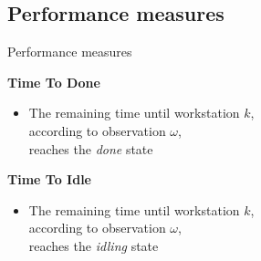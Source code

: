   \subsection{Performance measures}
    \begin{frame}{Performance measures}
      \newcommand{\schemascale}{0.45}
      
      \begin{minipage}{\descriptionwidth}
        \textbf{Time To Done}
        \begin{itemize}
          \item The remaining time until workstation $k$,\\
            according to observation $\omega$,\\
            reaches the \textit{done} state
        \end{itemize}
      \end{minipage}
      \begin{minipage}{\schemawidth}
        \begin{center}\scalebox{\schemascale}{}\end{center}
      \end{minipage}

      \vspace{\vspacegap}
      \begin{minipage}{\descriptionwidth}
        \textbf{Time To Idle}
        \begin{itemize}
          \item The remaining time until workstation $k$,\\
            according to observation $\omega$,\\
            reaches the \textit{idling} state
        \end{itemize}
      \end{minipage}
      \begin{minipage}{\schemawidth}
        \begin{center}\scalebox{\schemascale}{}\end{center}
      \end{minipage}
      

\end{frame}
